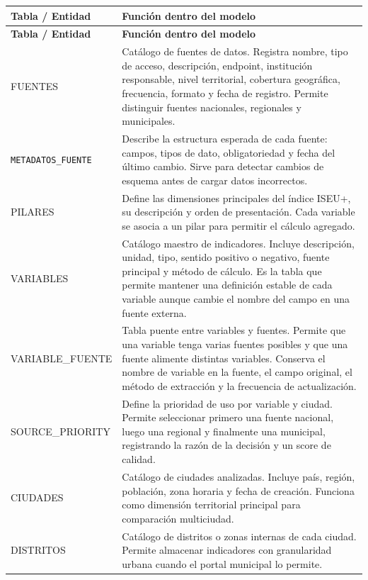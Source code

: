 \begin{longtable}{>{\raggedright\arraybackslash}p{} >{\raggedright\arraybackslash}p{}}
\toprule
\textbf{Tabla / Entidad} & \textbf{Función dentro del modelo} \\
\midrule
\endfirsthead
\toprule
\textbf{Tabla / Entidad} & \textbf{Función dentro del modelo} \\
\midrule
\endhead
FUENTES & Catálogo de fuentes de datos. Registra nombre, tipo de acceso, descripción, endpoint, institución responsable, nivel territorial, cobertura geográfica, frecuencia, formato y fecha de registro. Permite distinguir fuentes nacionales, regionales y municipales. \\
\texttt{METADATOS\_}\newline\texttt{FUENTE} & Describe la estructura esperada de cada fuente: campos, tipos de dato, obligatoriedad y fecha del último cambio. Sirve para detectar cambios de esquema antes de cargar datos incorrectos. \\
PILARES & Define las dimensiones principales del índice ISEU+, su descripción y orden de presentación. Cada variable se asocia a un pilar para permitir el cálculo agregado. \\
VARIABLES & Catálogo maestro de indicadores. Incluye descripción, unidad, tipo, sentido positivo o negativo, fuente principal y método de cálculo. Es la tabla que permite mantener una definición estable de cada variable aunque cambie el nombre del campo en una fuente externa. \\
VARIABLE\_FUENTE & Tabla puente entre variables y fuentes. Permite que una variable tenga varias fuentes posibles y que una fuente alimente distintas variables. Conserva el nombre de variable en la fuente, el campo original, el método de extracción y la frecuencia de actualización. \\
SOURCE\_PRIORITY & Define la prioridad de uso por variable y ciudad. Permite seleccionar primero una fuente nacional, luego una regional y finalmente una municipal, registrando la razón de la decisión y un score de calidad. \\
CIUDADES & Catálogo de ciudades analizadas. Incluye país, región, población, zona horaria y fecha de creación. Funciona como dimensión territorial principal para comparación multiciudad. \\
DISTRITOS & Catálogo de distritos o zonas internas de cada ciudad. Permite almacenar indicadores con granularidad urbana cuando el portal municipal lo permite. \\

\end{longtable}
